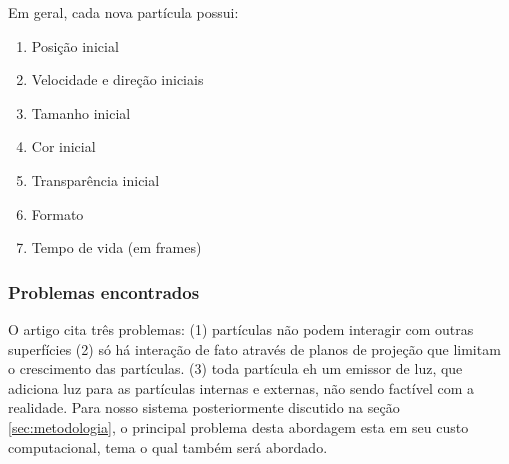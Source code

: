 Em geral, cada nova partícula possui: 

\begin{enumerate}
  \setlength{\itemsep}{0.05em}
\item Posição inicial
\item Velocidade e direção iniciais
\item Tamanho inicial
\item Cor inicial
\item Transparência inicial
\item Formato
\item Tempo de vida (em frames)
\end{enumerate}

\subsubsection{Problemas encontrados}
O artigo cita três problemas: (1) partículas não podem interagir com outras superfícies (2) só há interação de fato através de planos de projeção que limitam o crescimento das partículas. (3) toda partícula eh um emissor de luz, que adiciona luz para as partículas internas e externas, não sendo factível com a realidade. Para nosso sistema posteriormente discutido na seção \ref{sec:metodologia}, o principal problema desta abordagem esta em seu custo computacional, tema o qual também será abordado.
